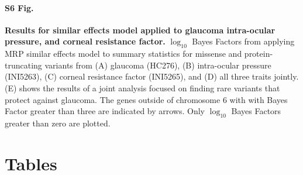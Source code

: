 \paragraph*{S6 Fig.}
\label{glaucoma_similar}
{\bf Results for similar effects model applied to glaucoma intra-ocular pressure, and corneal resistance factor.} $\log_{10}$ Bayes Factors from applying MRP similar effects model to summary statistics for missense and protein-truncating variants from (A) glaucoma (HC276), (B) intra-ocular pressure (INI5263), (C) corneal resistance factor (INI5265), and (D) all three traits jointly. (E) shows the results of a joint analysis focused on finding rare variants that protect against glaucoma. The genes outside of chromosome 6 with with Bayes Factor greater than three are indicated by arrows. Only $\log_{10}$ Bayes Factors greater than zero are plotted.

\pagebreak

\section*{Tables}

